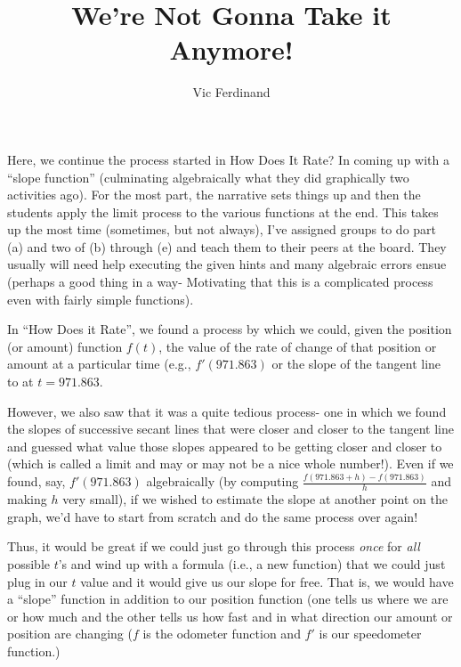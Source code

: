 \documentclass{ximera}
\author{Vic Ferdinand}
\title{We're Not Gonna Take it Anymore!}
\begin{document}
\begin{abstract} 
\end{abstract}
\maketitle

\begin{instructorIntro}
Here, we continue the process started in How Does It Rate?  In coming up with a ``slope function'' (culminating algebraically what they did graphically two activities ago).  For the most part, the narrative sets things up and then the students apply the limit process to the various functions at the end.  This takes up the most time (sometimes, but not always), I've assigned groups to do part (a) and two of (b) through (e) and teach them to their peers at the board.  They usually will need help executing the given hints and many algebraic errors ensue (perhaps a good thing in a way- Motivating that this is a complicated process even with fairly simple functions).
\end{instructorIntro}



In ``How Does it Rate'', we found a process by which we could, given the position (or amount) function  $f(t)$, the value of the rate of change of that position or amount at a particular time (e.g., $f'(971.863)$  or the slope of the tangent line to at $t=971.863$.

However, we also saw that it was a quite tedious process- one in which we found the slopes of successive secant lines that were closer and closer to the tangent line and guessed what value those slopes appeared to be getting closer and closer to (which is called a limit and may or may not be a nice whole number!).  Even if we found, say, $f'(971.863)$ algebraically (by computing $\frac{f(971.863+h) - f(971.863)}{h}$  and making $h$ very small), if we wished to estimate the slope at another point on the graph, we'd have to start from scratch and do the same process over again!

Thus, it would be great if we could just go through this process {\em once} for {\em all} possible $t$'s and wind up with a formula (i.e., a new function) that we could just plug in our $t$ value and it would give us our slope for free.  That is, we would have a ``slope'' function in addition to our position function (one tells us where we are or how much and the other tells us how fast and in what direction our amount or position are changing ($f$ is the odometer function and $f'$ is our speedometer function.)
\end{document}
